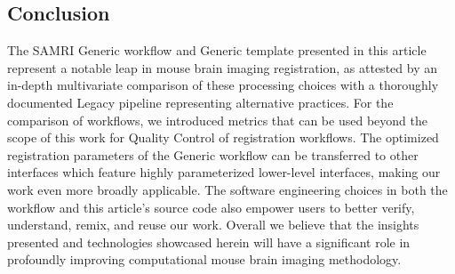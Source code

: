 \subsection{Conclusion}

The SAMRI Generic workflow and Generic template presented in this article represent a notable leap in mouse brain imaging registration, as attested by an in-depth multivariate comparison of these processing choices with a thoroughly documented Legacy pipeline representing alternative practices.
For the comparison of workflows, we introduced metrics that can be used beyond the scope of this work for Quality Control of registration workflows.
The optimized registration parameters of the Generic workflow can be transferred to other interfaces which feature highly parameterized lower-level interfaces, making our work even more broadly applicable.
The software engineering choices in both the workflow and this article's source code also empower users to better verify, understand, remix, and reuse our work.
Overall we believe that the insights presented and technologies showcased herein will have a significant role in profoundly improving computational mouse brain imaging methodology.
